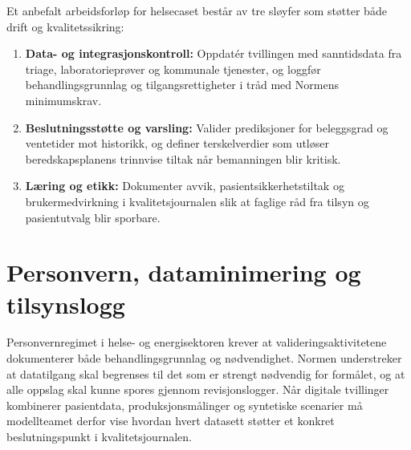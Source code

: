 Et anbefalt arbeidsforløp for helsecaset består av tre sløyfer som støtter både drift og kvalitetssikring:
\begin{enumerate}
    \item \textbf{Data- og integrasjonskontroll:} Oppdatér tvillingen med sanntidsdata fra triage, laboratorieprøver og kommunale tjenester, og loggfør behandlingsgrunnlag og tilgangsrettigheter i tråd med Normens minimumskrav.
    \item \textbf{Beslutningsstøtte og varsling:} Valider prediksjoner for beleggsgrad og ventetider mot historikk, og definer terskelverdier som utløser beredskapsplanens trinnvise tiltak når bemanningen blir kritisk.
    \item \textbf{Læring og etikk:} Dokumenter avvik, pasientsikkerhetstiltak og brukermedvirkning i kvalitetsjournalen slik at faglige råd fra tilsyn og pasientutvalg blir sporbare.
\end{enumerate}

\section{Personvern, dataminimering og tilsynslogg}
Personvernregimet i helse- og energisektoren krever at valideringsaktivitetene dokumenterer både behandlingsgrunnlag og nødvendighet. Normen understreker at datatilgang skal begrenses til det som er strengt nødvendig for formålet, og at alle oppslag skal kunne spores gjennom revisjonslogger.\citep{norm2023} Når digitale tvillinger kombinerer pasientdata, produksjonsmålinger og syntetiske scenarier må modellteamet derfor vise hvordan hvert datasett støtter et konkret beslutningspunkt i kvalitetsjournalen.

